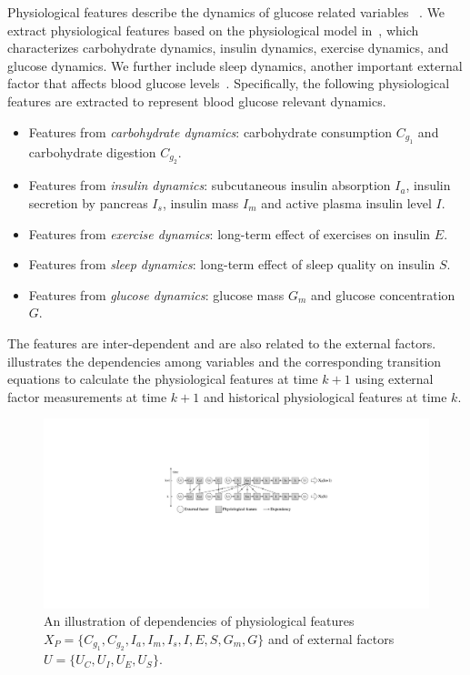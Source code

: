 Physiological features describe the dynamics of glucose related variables~\cite{bib:duke2010intelligent} \cite{bib:MAIHA14:Plis}.
We extract physiological features based on the physiological model in~\cite{bib:duke2010intelligent}, which characterizes carbohydrate dynamics, insulin dynamics, exercise dynamics, and glucose dynamics.
We further include sleep dynamics, another important external factor that affects blood glucose levels~\cite{bib:DRCP15:Iwasaki}.
Specifically, the following physiological features are extracted to represent blood glucose relevant dynamics.
\begin{itemize}
  \item
  Features from \emph{carbohydrate dynamics}:
  carbohydrate consumption $C_{g_1}$ and carbohydrate digestion $C_{g_2}$.
  \item
  Features from \emph{insulin dynamics}:
  subcutaneous insulin absorption $I_{a}$, insulin secretion by pancreas $I_{s}$, insulin mass $I_{m}$ and active plasma insulin level $I$.
  \item
  Features from \emph{exercise dynamics}:
  long-term effect of exercises on insulin $E$.
  \item
  Features from \emph{sleep dynamics}:
  long-term effect of sleep quality on insulin $S$.
  \item
  Features from \emph{glucose dynamics}:
  glucose mass $G_m$ and glucose concentration $G$.
\end{itemize}
The features are inter-dependent and are also related to the external factors.
 illustrates the dependencies among variables and the corresponding transition equations to calculate the physiological features at time $k+1$ using external factor measurements at time $k+1$ and historical physiological features at time $k$.

\begin{figure}[h]
  \centering
  \includegraphics[width=0.9\columnwidth]{./img/Physiological_correlation2.pdf}
  \caption{An illustration of dependencies of physiological features $X_P=\{C_{g_1}, C_{g_2}, I_{a}, I_{m}, I_{s}, I, E, S,  G_{m}, G\}$ and of external factors $U=\{U_C, U_I, U_E, U_S\}$.}
  \label{fig:phymodel}
\end{figure}

